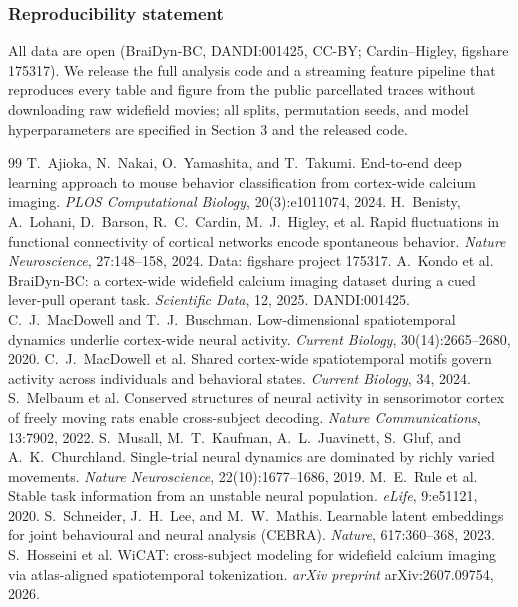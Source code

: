 \documentclass{article}
\begin{document}
\subsubsection*{Reproducibility statement}
All data are open (BraiDyn-BC, DANDI:001425, CC-BY; Cardin--Higley, figshare 175317). We release
the full analysis code and a streaming feature pipeline that reproduces every table and figure
from the public parcellated traces without downloading raw widefield movies; all splits,
permutation seeds, and model hyperparameters are specified in Section 3 and the released code.


\begin{thebibliography}{99}
 T.~Ajioka, N.~Nakai, O.~Yamashita, and T.~Takumi.
End-to-end deep learning approach to mouse behavior classification from cortex-wide calcium
imaging. \emph{PLOS Computational Biology}, 20(3):e1011074, 2024.
 H.~Benisty, A.~Lohani, D.~Barson, R.~C.~Cardin,
M.~J.~Higley, et al. Rapid fluctuations in functional connectivity of cortical networks encode
spontaneous behavior. \emph{Nature Neuroscience}, 27:148--158, 2024. Data: figshare project 175317.
 A.~Kondo et al. BraiDyn-BC: a cortex-wide widefield calcium
imaging dataset during a cued lever-pull operant task. \emph{Scientific Data}, 12, 2025.
DANDI:001425.
 C.~J.~MacDowell and T.~J.~Buschman.
Low-dimensional spatiotemporal dynamics underlie cortex-wide neural activity. \emph{Current
Biology}, 30(14):2665--2680, 2020.
 C.~J.~MacDowell et al. Shared cortex-wide
spatiotemporal motifs govern activity across individuals and behavioral states. \emph{Current
Biology}, 34, 2024.
 S.~Melbaum et al. Conserved structures of neural
activity in sensorimotor cortex of freely moving rats enable cross-subject decoding. \emph{Nature
Communications}, 13:7902, 2022.
 S.~Musall, M.~T.~Kaufman, A.~L.~Juavinett, S.~Gluf, and
A.~K.~Churchland. Single-trial neural dynamics are dominated by richly varied movements.
\emph{Nature Neuroscience}, 22(10):1677--1686, 2019.
 M.~E.~Rule et al. Stable task information from an unstable
neural population. \emph{eLife}, 9:e51121, 2020.
 S.~Schneider, J.~H.~Lee, and M.~W.~Mathis.
Learnable latent embeddings for joint behavioural and neural analysis (CEBRA). \emph{Nature},
617:360--368, 2023.
 S.~Hosseini et al. WiCAT: cross-subject modeling for
widefield calcium imaging via atlas-aligned spatiotemporal tokenization. \emph{arXiv preprint}
arXiv:2607.09754, 2026.
\end{thebibliography}
\end{document}
